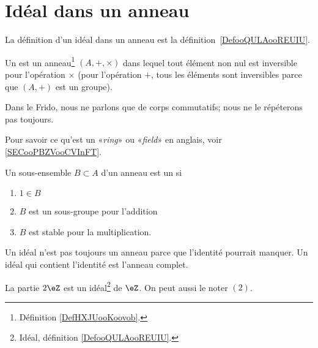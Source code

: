 \section{Idéal dans un anneau}

La définition d'un idéal dans un anneau est la définition~\ref{DefooQULAooREUIU}.

\begin{definition}  \label{DefTMNooKXHUd}
	Un  est un anneau\footnote{Définition \ref{DefHXJUooKoovob}.} \( (A, +,\times)\) dans lequel tout élément non nul est inversible pour l'opération \( \times\) (pour l'opération \( +\), tous les éléments sont inversibles parce que \( (A,+)\) est un groupe).
\end{definition}

\begin{normaltext}
	Dans le Frido, nous ne parlons que de corps commutatifs; nous ne le répéterons pas toujours.
\end{normaltext}

\begin{normaltext}
	Pour savoir ce qu'est un «\emph{ring}» ou «\emph{field}» en anglais, voir \ref{SECooPBZVooCVInFT}.
\end{normaltext}

\begin{definition}  \label{DefAJVTPxb}
	Un sous-ensemble \( B\subset A\) d'un anneau est un  si
	\begin{enumerate}
		\item
		      \( 1\in B\)
		\item
		      \( B\) est un sous-groupe pour l'addition
		\item
		      \( B\) est stable pour la multiplication.
	\end{enumerate}
\end{definition}

\begin{remark}
	Un idéal n'est pas toujours un anneau parce que l'identité pourrait manquer. Un idéal qui contient l'identité est l'anneau complet.
\end{remark}

\begin{lemma}       \label{LEMooQAYSooCYJXkC}
	La partie \( 2\eZ\) est un idéal\footnote{Idéal, définition \ref{DefooQULAooREUIU}.} de \( \eZ\). On peut aussi le noter \( (2) \).
\end{lemma}

